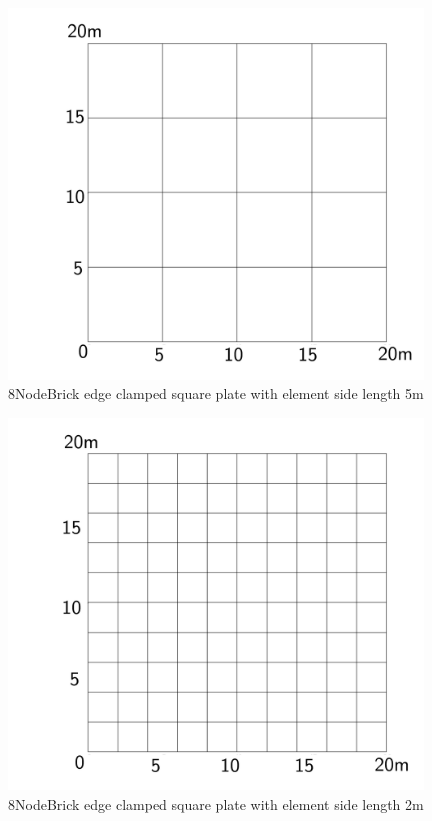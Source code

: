 \documentclass[fleqn,11pt]{article}
\begin{document}
\begin{figure}[H]
  \centering
  \includegraphics[width=11cm]{../Figure-files/square_plate2.pdf}
  \caption{8NodeBrick edge clamped square plate with element side length 5m }
  \label{fig 8NodeBrick edges clamped square plate with element side length 5m }
\end{figure}


\begin{figure}[H]
  \centering
  \includegraphics[width=11cm]{../Figure-files/square_plate3.pdf}
  \caption{8NodeBrick edge clamped square plate with element side length 2m }
  \label{fig 8NodeBrick edges clamped square plate with element side length 2m }
\end{figure}
\end{document}
